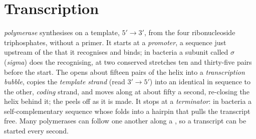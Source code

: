 \section{Transcription}

\begin{definition}\label{def:b1:gene-expression:transcription}
\emph{ polymerase} synthesises  on a  template, $5' \to 3'$,
from the four ribonucleoside triphosphates, without a primer. It
starts at a \emph{promoter}, a sequence just upstream of the 
that it recognises and binds; in bacteria a subunit called
$\sigma$ (\emph{sigma}) does the recognising, at two conserved
stretches ten and thirty-five pairs before the start. The  opens
about fifteen pairs of the helix into a \emph{transcription bubble},
copies the \emph{template strand} (read $3' \to 5'$) into an 
identical in sequence to the other, \emph{coding} strand, and moves
along at about fifty  a second, re-closing the helix behind
it; the  peels off as it is made. It stops at a
\emph{terminator}: in bacteria a self-complementary sequence whose 
folds into a hairpin that pulls the transcript free. Many polymerases
can follow one another along a , so a transcript can be started
every second.
\end{definition}

